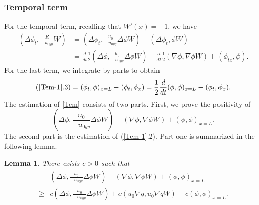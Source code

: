 \documentclass[reqno, 11pt]{amsart}
\theoremstyle{plain}
\newtheorem{lemma}[theorem]{Lemma}
\theoremstyle{definition}
\theoremstyle{remark}
\numberwithin{equation}{section}
\begin{document}
\subsubsection{Temporal term} For the temporal term, recalling that $W'(x) = -1$, we have
\begin{equation}\label{Tem}
\begin{aligned}
(\Delta \phi_t, \frac{R}{-u_{0yy}}W ) &= (\Delta \phi_t, \frac{u_0}{-u_{0yy} } \Delta \phi W) + (\Delta \phi_t, \phi W)\\
&= \frac{d}{dt} \frac{1}{2} (\Delta {\phi}, \frac{u_0}{-u_{0yy} } \Delta \phi W) - \frac{d}{dt} \frac{1}{2} (\nabla \phi, \nabla \phi W) + (\phi_{tx} , \phi) .
\end{aligned}
\end{equation}
For the last term, we integrate by parts to obtain
\begin{equation}\label{Tem-1}
\begin{aligned}
(\ref{Tem-1}.3) = (\phi_t, \phi)_{x=L} - (\phi_t, \phi_x) = \frac{1}{2} \frac{d}{dt} (\phi,\phi)_{x=L} - (\phi_t, \phi_x).
\end{aligned}
\end{equation}
The estimation of \eqref{Tem} consists of two parts. First, we prove the positivity of 
\begin{equation}\label{Tem_term}
(\Delta {\phi}, \frac{u_0}{-u_{0yy} } \Delta \phi W) - (\nabla \phi, \nabla \phi W) + (\phi,\phi)_{x=L}.
\end{equation}
The second part is the estimation of (\ref{Tem-1}.2). Part one is summarized in the following lemma.
\begin{lemma}\label{lem:positive}
There exists $c > 0$ such that
\begin{equation}\label{Tem_positive}
\begin{aligned}
&(\Delta {\phi}, \frac{u_0}{-u_{0yy} } \Delta \phi W) - (\nabla \phi, \nabla \phi W) + (\phi,\phi)_{x=L}\\
 \ge &c(\Delta {\phi}, \frac{u_0}{-u_{0yy} } \Delta \phi W) + c ( u_0 \nabla q, u_0 \nabla q W) + c(\phi,\phi)_{x=L}.
\end{aligned}
\end{equation}
\end{lemma}
\end{document}
